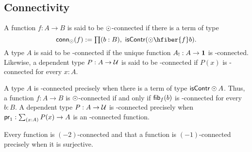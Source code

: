 \subsection{Connectivity}
\begin{defn}
A function $f:A\to B$ is said to be $\odot$-connected if there is a term of type
\begin{equation*}
\mathsf{conn}_\modal(f):=\prd{b:B}\iscontr(\modal\hfiber{f}b). 
\end{equation*}
A type $A$ is said to be \modal-connected if the unique function
$A_!:A\to\mathbf{1}$ is \modal-connected. Likewise, a dependent type
$P:A\to\mathcal{U}$ is said to be \modal-connected if $P(x)$ is \modal-connected for
every $x:A$. 
\end{defn}

A type $A$ is \modal-connected precisely when there is a term of type $\mathsf{isContr}\odot A$. Thus, a function $f:A\to B$ is
$\odot$-connected if and only if $\mathsf{fib}_{f}(b)$ is \modal-connected for every $b:B$. 
A dependent type $P:A\to\mathcal{U}$ is \modal-connected
precisely when $\proj1:\sm{x:A} P(x)\to A$ is an \modal-connected function.

Every function is $(-2)$-connected and that a function is $(-1)$-connected precisely when it is surjective.

